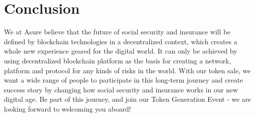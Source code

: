 \section{Conclusion}

We at Asure believe that the future of social security and insurance will be defined by blockchain technologies in a decentralized context, which creates a whole new experience geared for the digital world. It can only be achieved by using decentralized blockchain platform as the basis for creating a network, platform and protocol for any kinds of risks in the world.
\newline
With our token sale, we want a wide range of people to participate in this long-term journey and create success story by changing how social security and insurance works in our new digital age.
Be part of this journey, and join our Token Generation Event - we are looking forward to welcoming you aboard!